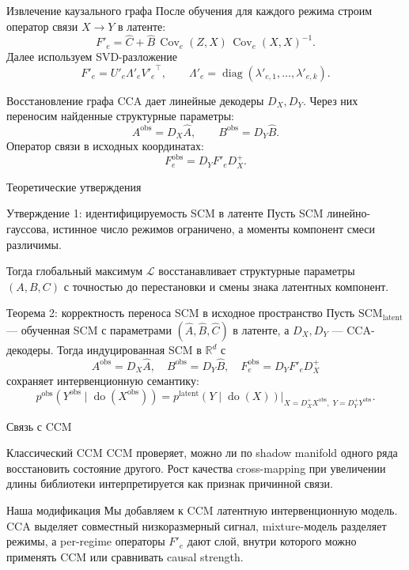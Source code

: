 \documentclass[19pt,pdf,hyperref={unicode}]{beamer}
\newcommand{\R}{\mathbb{R}}
\newcommand{\Loss}{\mathcal{L}}
\newcommand{\doop}{\operatorname{do}}
\newcommand{\Cov}{\operatorname{Cov}}
\newcommand{\diag}{\operatorname{diag}}
\newcommand{\Xobs}{X^{\mathrm{obs}}}
\newcommand{\Yobs}{Y^{\mathrm{obs}}}
\begin{document}
\begin{frame}{Извлечение каузального графа}
После обучения для каждого режима строим оператор связи $X \to Y$ в латенте:
\[
    F'_e = \hat C + \hat B\,\Cov_e(Z,X)\,\Cov_e(X,X)^{-1}.
\]
Далее используем SVD-разложение
\[
    F'_e = U'_e \Lambda'_e {V'_e}^{\top},
    \qquad
    \Lambda'_e = \diag(\lambda'_{e,1},\dots,\lambda'_{e,k}).
\]

\begin{block}{Восстановление  графа}
CCA дает линейные декодеры $D_X,D_Y$. Через них переносим найденные структурные параметры:
\[
    A^{\mathrm{obs}} = D_X\hat A, \qquad
    B^{\mathrm{obs}} = D_Y\hat B.
\]
Оператор связи в исходных координатах:
\[
    F^{\mathrm{obs}}_e = D_Y F'_e D_X^+.
\]

\end{block}
\end{frame}

\begin{frame}{Теоретические утверждения}
\small
\begin{block}{Утверждение 1: идентифицируемость SCM в латенте}
Пусть SCM линейно-гауссова, истинное число режимов ограничено, а моменты компонент смеси различимы.

Тогда глобальный максимум $\Loss$ восстанавливает структурные параметры $(A,B,C)$ с точностью до перестановки и смены знака латентных компонент.
\end{block}

\begin{block}{Теорема 2: корректность переноса SCM в исходное пространство}
Пусть $\mathrm{SCM}_{\mathrm{latent}}$ --- обученная SCM с параметрами $(\hat A,\hat B,\hat C)$ в латенте, а $D_X,D_Y$ --- CCA-декодеры. Тогда индуцированная SCM в $\R^d$ с
\[
A^{\mathrm{obs}}=D_X\hat A,\quad B^{\mathrm{obs}}=D_Y\hat B,\quad F_e^{\mathrm{obs}}=D_YF'_eD_X^+
\]
сохраняет интервенционную семантику:
\[
 p^{\mathrm{obs}}(\Yobs\mid\doop(\Xobs))=
 p^{\mathrm{latent}}(Y\mid\doop(X))\Big|_{X=D_X^+\Xobs,\;Y=D_Y^+\Yobs}.
\]
\end{block}
\end{frame}

\begin{frame}{Связь с CCM}
\begin{block}{Классический CCM}
CCM проверяет, можно ли по shadow manifold одного ряда восстановить состояние другого. Рост качества cross-mapping при увеличении длины библиотеки интерпретируется как признак причинной связи.
\end{block}

\begin{block}{Наша модификация}
Мы добавляем к CCM латентную интервенционную модель. CCA выделяет совместный низкоразмерный сигнал, mixture-модель разделяет режимы, а per-regime операторы $F'_e$ дают слой, внутри которого можно применять CCM или сравнивать causal strength.
\end{block}
\end{frame}
\end{document}
